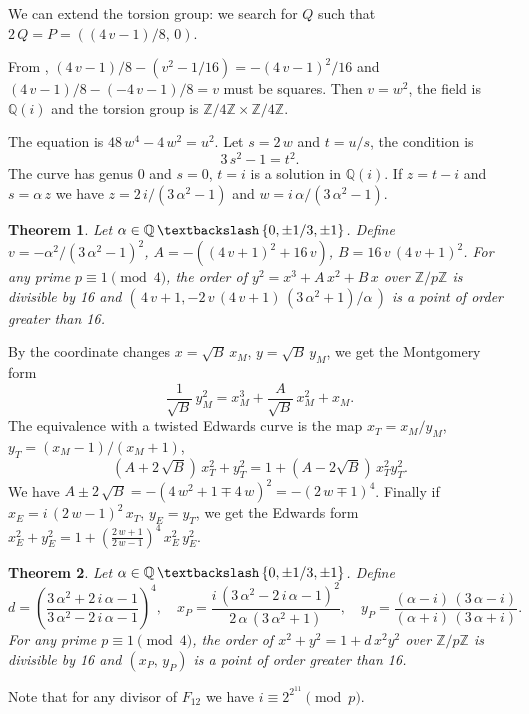\documentclass[a4paper, 11pt, pdftex]{report}
\theoremstyle{plain}
\newtheorem{theorem}{Theorem}[chapter]
\theoremstyle{definition}
\begin{document}
We can extend the torsion group: we search for $Q$ such that $2\,Q = P = ((4\,v - 1)/8,\, 0)$.

From \cite[Theorem 4.2]{Knapp1}, $(4\,v - 1)/8 - (v^2 - 1/16) = -(4\,v - 1)^2 / 16$ and
$(4\,v - 1)/8 - (-4\,v - 1)/8 = v$ must be squares. Then $v = w^2$, the field is
$\mathbb{Q}(i)$ and the torsion group is $\mathbb{Z}/4\mathbb{Z} \times \mathbb{Z}/4\mathbb{Z}$.

The equation is $48\,w^4 - 4\,w^2 = u^2$. Let $s = 2\,w$ and $t = u / s$, the condition is
$$3\,s^2 - 1 = t^2.$$
The curve has genus 0 and $s = 0$, $t = i$ is a solution in $\mathbb{Q}(i)$. If $z = t - i$
and $s = \alpha\,z$ we have $z = 2\,i / (3\,\alpha^2 - 1)$ and $w = i\, \alpha / (3\,\alpha^2 - 1)$.

\begin{theorem}
Let $\alpha \in \mathbb{Q}\, \textbackslash \, \{0, \pm1/3, \pm1\}$.
Define $v = -\alpha^2 / (3\,\alpha^2 - 1)^2$, $A = -((4\,v+1)^2 + 16\,v)$,
$B = 16\,v\,(4\,v + 1)^2$. For any prime $p \equiv 1 \pmod{4}$,
the order of $y^2 = x^3 + A\, x^2 + B\, x$ over $\mathbb{Z}/p\mathbb{Z}$ is divisible by 16
and $(\,4\,v + 1, - 2\,v\,(4\,v + 1)\,(3\,\alpha^2 + 1)/\alpha\,)$ is a point of order
greater than 16.
\end{theorem}

By the coordinate changes $x = \sqrt{B}\,x_M$, $y = \sqrt{B}\,y_M$, we get the Montgomery form
$$\frac{1}{\sqrt{B}}\, y_M^2 = x_M^3 + \frac{A}{\sqrt{B}}\, x_M^2 + x_M.$$
The equivalence with a twisted Edwards curve is the map $x_T = x_M / y_M$,
$y_T = (x_M - 1)/(x_M + 1)$,
$$(A + 2\,\sqrt{B})\,x_T^2 + y_T^2 = 1 + (A - 2\sqrt{B})\,x_T^2y_T^2.$$
We have $A \pm 2\,\sqrt{B} = -(4\,w^2+1 \mp 4\,w)^2
= -(2\,w \mp 1)^4$.
Finally if $x_E = i\,(2\,w - 1)^2\,x_T$, $y_E = y_T$, we get the Edwards form
$x_E^2 + y_E^2 = 1 + \left(\frac{2\,w + 1}{2\,w - 1}\right)^4\,x_E^2\,y_E^2$.

\begin{theorem} \label{Th_4x4}
Let $\alpha \in \mathbb{Q}\, \textbackslash \, \{0, \pm1/3, \pm1\}$. Define
$$d = \left( \frac{3\,\alpha^2 + 2\,i\,\alpha - 1}{3\,\alpha^2 - 2\,i\,\alpha -1} \right)^4,\quad
x_P = \frac{i \, (3\,\alpha^2 - 2\,i\,\alpha - 1)^2}{2\, \alpha\, (3\,\alpha^2 + 1)},\quad
y_P = \frac{(\alpha - i)\,(3\,\alpha - i)}{(\alpha + i)\,(3\,\alpha + i)}.$$
For any prime $p \equiv 1 \pmod{4}$, the order of $x^2 + y^2 = 1 + d\,x^2y^2$ over
$\mathbb{Z}/p\mathbb{Z}$ is divisible by 16 and $(x_P,\,y_P)$ is a point of order greater than 16.
\end{theorem}
Note that for any divisor of $F_{12}$ we have $i \equiv 2^{2^{11}} \pmod{p}$.
\end{document}
